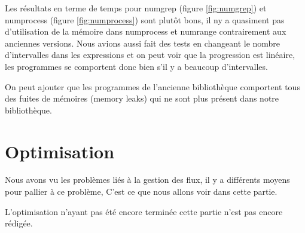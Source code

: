 Les r\'esultats en terme de temps pour numgrep (figure \ref{fig:numgrep}) et numprocess (figure \ref{fig:numprocess}) sont plut\^ot bons, il ny a quasiment pas d'utilisation de la m\'emoire dans numprocess et numrange contrairement aux anciennes versions. 
Nous avions aussi fait des tests en changeant le nombre d'intervalles dans les expressions et on peut voir que la progression est lin\'eaire, les programmes se comportent donc bien s'il y a beaucoup d'intervalles.

On peut ajouter que les programmes de l'ancienne biblioth\`eque comportent tous des fuites de m\'emoires (memory leaks) qui ne sont plus pr\'esent 
dans notre biblioth\`eque.

\section{Optimisation}

Nous avons vu les probl\`emes li\'es \`a la gestion des flux, il y a diff\'erents moyens pour pallier \`a ce probl\`eme, 
C'est ce que nous allons voir dans cette partie.

L'optimisation n'ayant pas \'et\'e encore termin\'ee cette partie n'est pas encore r\'edig\'ee.